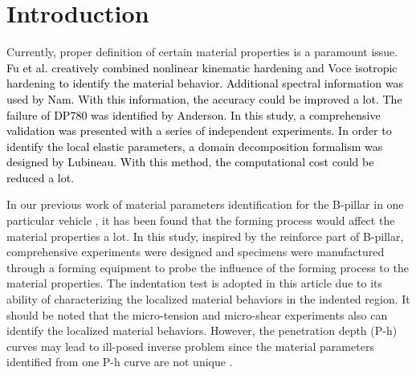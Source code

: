 \documentclass[review]{elsarticle}
\begin{document}
\linenumbers

\section{Introduction}

Currently, proper definition of certain material properties is a paramount issue. \textcolor{black}{Fu et al.\cite{fu2016identification} creatively combined nonlinear kinematic hardening and Voce isotropic hardening to identify the material behavior. Additional spectral information was used by Nam\cite{nam2005improved}. With this information, the accuracy could be improved a lot. The failure of \textcolor{black}{DP780} was identified by Anderson\cite{anderson2017failure}. In this study, a comprehensive validation was presented with a series of independent experiments. In order to identify the local elastic parameters, a domain decomposition formalism was designed by Lubineau\cite{lubineau2015domain}. With this method, the computational cost could be reduced a lot.} 

In our previous work of material parameters identification for the B-pillar in one particular vehicle \cite{wang2016surrogate}, it has been found that the forming process would affect the material properties a lot. In this study, inspired by the reinforce part of B-pillar, comprehensive experiments were designed and specimens were manufactured through a forming equipment to probe the influence of the forming process to the material properties. The indentation test is adopted in this article due to its ability of characterizing the localized material behaviors in the indented region. It should be noted that the micro-tension and micro-shear experiments \cite{gorji2017micro} also can identify the localized material behaviors. However, the penetration depth (P-h) curves may lead to ill-posed inverse problem since the material parameters identified from one P-h curve are not unique \cite{alkorta2005absence}. 
\end{document}
